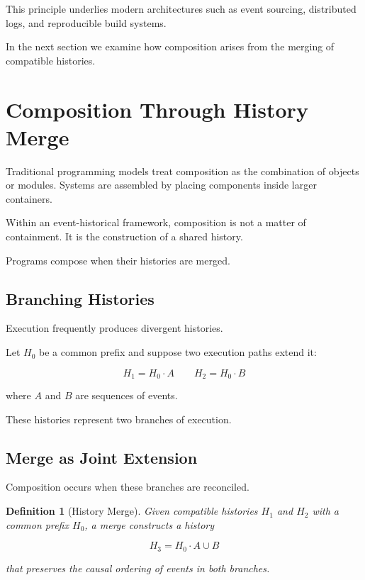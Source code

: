 \documentclass[12pt]{article}
\newtheorem{definition}{Definition}
\begin{document}
This principle underlies modern architectures such as
event sourcing, distributed logs, and reproducible
build systems.

In the next section we examine how composition
arises from the merging of compatible histories.


\section{Composition Through History Merge}

Traditional programming models treat composition as the
combination of objects or modules. Systems are assembled
by placing components inside larger containers.

Within an event-historical framework, composition is not
a matter of containment. It is the construction of a
shared history.

Programs compose when their histories are merged.

\subsection{Branching Histories}

Execution frequently produces divergent histories.

Let $H_0$ be a common prefix and suppose two execution
paths extend it:

\[
H_1 = H_0 \cdot A
\qquad
H_2 = H_0 \cdot B
\]

where $A$ and $B$ are sequences of events.

These histories represent two branches of execution.

\subsection{Merge as Joint Extension}

Composition occurs when these branches are reconciled.

\begin{definition}[History Merge]
Given compatible histories $H_1$ and $H_2$ with a common
prefix $H_0$, a merge constructs a history

\[
H_3 = H_0 \cdot A \cup B
\]

that preserves the causal ordering of events in both
branches.
\end{definition}
\end{document}
